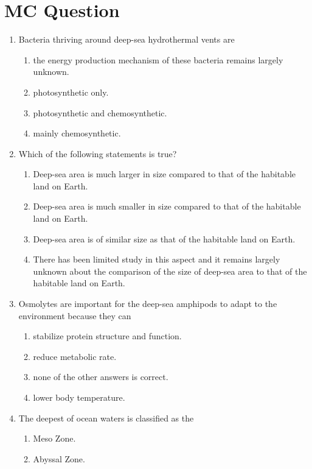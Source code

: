 \documentclass{report}
\begin{document}
\section{MC Question}
\begin{enumerate}
    \item Bacteria thriving around deep-sea hydrothermal vents are
    \begin{enumerate}
        \item   the energy production mechanism of these bacteria remains largely unknown.
        \item   photosynthetic only. 
        \item   photosynthetic and chemosynthetic. 
        \item   mainly chemosynthetic. 
    \end{enumerate}
    \item Which of the following statements is true?
    \begin{enumerate}
        \item   Deep-sea area is much larger in size compared to that of the habitable land on Earth.
        \item   Deep-sea area is much smaller in size compared to that of the habitable land on Earth.
        \item   Deep-sea area is of similar size as that of the habitable land on Earth. 
        \item   There has been limited study in this aspect and it remains largely unknown about the comparison of the size of deep-sea area to that of the habitable land on Earth.
    \end{enumerate}
    \item Osmolytes are important for the deep-sea amphipods to adapt to the environment because they can
    \begin{enumerate}
        \item   stabilize protein structure and function. 
        \item   reduce metabolic rate. 
        \item   none of the other answers is correct. 
        \item   lower body temperature. 
    \end{enumerate}
    \item The deepest of ocean waters is classified as the
    \begin{enumerate}
        \item   Meso Zone. 
        \item   Abyssal Zone. 

\end{enumerate}
\end{enumerate}
\end{document}
